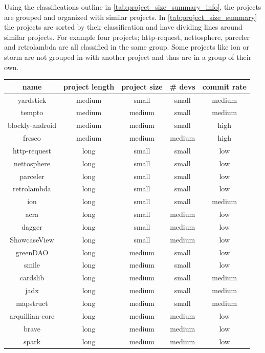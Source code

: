 Using the classifications outline in \autoref{tab:project_size_summary_info}, the projects are grouped and organized with similar projects. In \autoref{tab:project_size_summary} the projects are sorted by their classification and have dividing lines around similar projects. For example four projects; http-request, nettosphere, parceler and retrolambda are all classified in the same group. Some projects like ion or storm are not grouped in with another project and thus are in a group of their own.

\begin{table}
\begin{center}
    \begin{tabular}{|c|c|c|c|c|}
        \hline
        name & project length & project size & \# devs & commit rate \\
        \hline
        \hline
        yardstick & medium & small & small & medium \\
        \hline
        tempto & medium & medium & small & medium \\
        \hline
        blockly-android & medium & medium & small & high \\
        \hline
        fresco & medium & medium & medium & high \\
        \hline
        http-request & long & small & small & low \\
        nettosphere & long & small & small & low \\
        parceler & long & small & small & low \\
        retrolambda & long & small & small & low \\
        \hline
        ion & long & small & small & medium \\
        \hline
        acra & long & small & medium & low \\
        dagger & long & small & medium & low \\
        ShowcaseView & long & small & medium & low \\
        \hline
        greenDAO & long & medium & small & low \\
        smile & long & medium & small & low \\
        \hline
        cardslib & long & medium & small & medium \\
        jadx & long & medium & small & medium \\        
        mapstruct & long & medium & small & medium \\
        \hline
        arquillian-core & long & medium & medium & low \\
        brave & long & medium & medium & low \\
        spark & long & medium & medium & low \\
        \hline    
        

\end{tabular}
\end{center}
\end{table}
